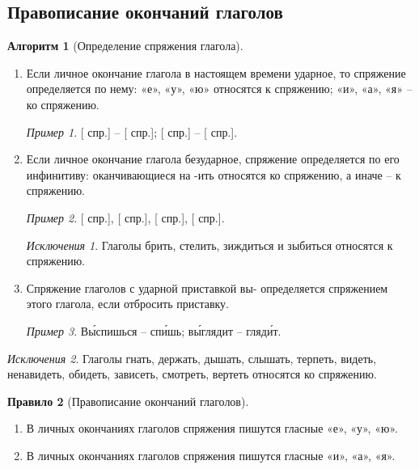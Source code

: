 \documentclass[12pt]{article}
\theoremstyle{definition}
\newtheorem{rrule}{Правило}[section]
\newtheorem{algorithm}[rrule]{Алгоритм}
\theoremstyle{remark}
\newtheorem*{example}{Пример}
\newtheorem*{exception}{Исключения}
\newcommand{\romannumeralcaps}[1]
    {\MakeUppercase{\romannumeral #1}}
\begin{document}
\subsection{Правописание окончаний глаголов}

\begin{algorithm}[Определение спряжения глагола]
    \hfill
    \begin{enumerate}
        \item Если личное окончание глагола в настоящем времени ударное, то спряжение определяется по нему: «е», «у», «ю» относятся к \romannumeralcaps{1} спряжению; «и», «а», «я» -- ко \romannumeralcaps{2} спряжению.
        \begin{example}
            [\romannumeralcaps{1} спр.] -- [\romannumeralcaps{1} спр.]; [\romannumeralcaps{2} спр.] -- [\romannumeralcaps{2} спр.].
        \end{example}
        \item Если личное окончание глагола безударное, спряжение определяется по его инфинитиву: оканчивающиеся на -ить относятся ко \romannumeralcaps{2} спряжению, а иначе – к \romannumeralcaps{1} спряжению.
        \begin{example}
            [\romannumeralcaps{1} спр.], [\romannumeralcaps{1} спр.], [\romannumeralcaps{2} спр.], [\romannumeralcaps{2} спр.].
        \end{example}
        \begin{exception}
            Глаголы брить, стелить, зиждиться и зыбиться относятся к \romannumeralcaps{1} спряжению.
        \end{exception}
        \item Спряжение глаголов с ударной приставкой вы- определяется спряжением этого глагола, если отбросить приставку.
        \begin{example}
            В\'{ы}спишься -- сп\'{и}шь; в\'{ы}глядит -- гляд\'{и}т.
        \end{example}
    \end{enumerate}
    \begin{exception}
        Глаголы гнать, держать, дышать, слышать, терпеть, видеть, ненавидеть, обидеть, зависеть, смотреть, вертеть относятся ко \romannumeralcaps{2} спряжению.
    \end{exception}
\end{algorithm}

\begin{rrule}[Правописание окончаний глаголов]
    \hfill
    \begin{enumerate}
        \item В личных окончаниях глаголов \romannumeralcaps{1} спряжения пишутся гласные «е», «у», «ю».
        \item В личных окончаниях глаголов \romannumeralcaps{2} спряжения пишутся гласные «и», «а», «я».
    \end{enumerate}
\end{rrule}
\end{document}
